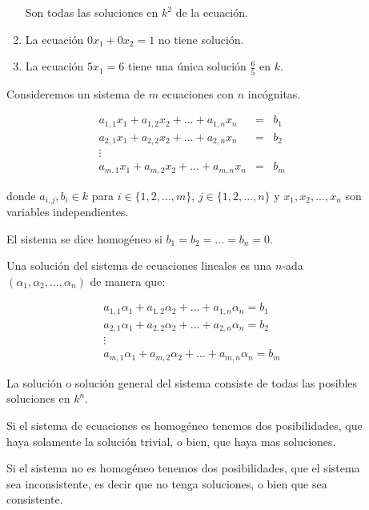 \documentclass[12pt]{article}
\begin{document}
\begin{description}
\begin{enumerate}
Son todas las soluciones en $k^2$ de la ecuación.

\item
La ecuación $0 x_1 + 0 x_2 = 1$ no tiene solución.

\item
La ecuación $5 x_1 = 6$ tiene una única solución $\frac{6}{5}$ en $k$.
\end{enumerate}

Consideremos un sistema de $m$ ecuaciones con $n$ incógnitas.

\begin{eqnarray}
a_{1,1} x_1 + a_{1,2} x_2 + \dots + a_{1,n} x_n & = & b_1 \nonumber \\
a_{2,1} x_1 + a_{2,2} x_2 + \dots + a_{2,n} x_n & = & b_2 \nonumber \\
\vdots                                          &   &     \nonumber \\
a_{m,1} x_1 + a_{m,2} x_2 + \dots + a_{m,n} x_n & = & b_m
\end{eqnarray}

donde $a_{i,j}, b_i \in k $ para $i \in \{ 1, 2, ..., m\}$, $j \in \{ 1, 2, ..., n \}$ y $x_1, x_2, ..., x_n$ son variables independientes.

El sistema se dice homogéneo si $b_1 = b_2 = ... = b_n = 0$.

Una solución del sistema de ecuaciones lineales es una $n$-ada $(\alpha_1, \alpha_2, ..., \alpha_n)$ de manera que:

\begin{eqnarray}
a_{1,1} \alpha_1 + a_{1,2} \alpha_2 + \dots + a_{1,n} \alpha_n = b_1 \nonumber \\
a_{2,1} \alpha_1 + a_{2,2} \alpha_2 + \dots + a_{2,n} \alpha_n = b_2 \nonumber \\
\vdots                                                               \nonumber \\
a_{m,1} \alpha_1 + a_{m,2} \alpha_2 + \dots + a_{m,n} \alpha_n = b_m
\end{eqnarray}

La solución o solución general del sistema consiste de todas las posibles soluciones en $k^n$.

Si el sistema de ecuaciones es homogéneo tenemos dos posibilidades, que haya solamente la solución trivial, o bien, que haya mas soluciones.

Si el sistema no es homogéneo tenemos dos posibilidades, que el sistema sea inconsistente, es decir que no tenga soluciones, o bien que sea consistente.


\end{description}
\end{document}
